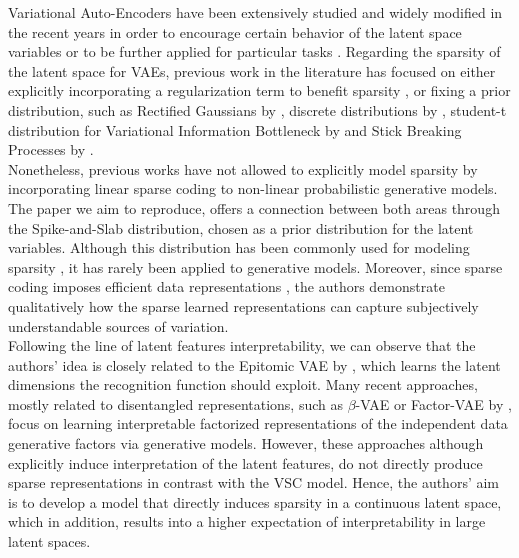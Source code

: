 Variational Auto-Encoders have been extensively studied \supercite{Doersch2016} and widely modified in the recent years in order to encourage certain behavior of the latent space variables \supercite{Nalisnick2016, rolfe2016discrete, casale2018gaussian} or to be further applied for particular tasks \supercite{chen2016variational,walker2016uncertain, kusner2017grammar, jin2018junction}. Regarding the sparsity of the latent space for VAEs, previous work in the literature has focused on either explicitly incorporating a regularization term to benefit sparsity \supercite{louizos2017learning}, or fixing a prior distribution, such as Rectified Gaussians by \supercite{salimans2016structured},  discrete distributions by \supercite{van2017neural}, student-t distribution for Variational Information Bottleneck by \supercite{Chalk2016} and Stick Breaking Processes by \supercite{Nalisnick2016}. \\

Nonetheless, previous works have not allowed to explicitly model sparsity by incorporating linear sparse coding to non-linear probabilistic generative models.  The paper we aim to reproduce, offers a connection between both areas through the  Spike-and-Slab distribution, chosen as a prior distribution for the latent variables. Although this distribution has been commonly used for modeling sparsity \supercite{Goodfellow2012}, it has rarely been applied to generative models. Moreover, since sparse coding imposes efficient data representations \supercite{ishwaran2005spike, titsias2011spike, bengio2013representation}, the authors demonstrate qualitatively how the sparse learned representations can capture subjectively understandable sources of variation. \\

Following the line of latent features interpretability, we can observe that the authors' idea is closely related to the Epitomic VAE by \supercite{yeung2016epitomic}, which learns the latent dimensions the recognition function should exploit. Many recent approaches, mostly related to disentangled representations, such as  $\beta$-VAE  \supercite{higgins2016beta, Burgess2018} or Factor-VAE by \supercite{Kim2018}, focus on learning interpretable factorized representations of the independent data generative factors via generative models. However, these approaches although explicitly induce interpretation of the latent features, do not directly produce sparse representations in contrast with the VSC model. Hence, the authors' aim is to develop a model that directly induces sparsity in a continuous latent space, which in addition, results into a higher expectation of interpretability in large latent spaces. \\

